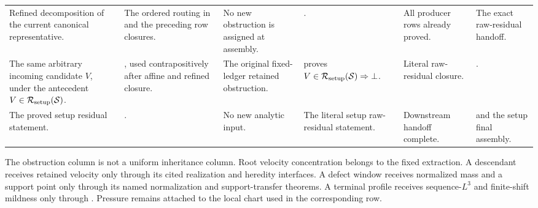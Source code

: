 \documentclass[11pt]{amsart}
\numberwithin{equation}{section}
\theoremstyle{plain}
\theoremstyle{definition}
\theoremstyle{remark}
\newcommand{\calS}{\mathcal S}
\newcommand{\calR}{\mathcal R}
\begin{document}
\begin{longtable}{@{}L{0.14\textwidth}L{0.19\textwidth}L{0.17\textwidth}L{0.17\textwidth}L{0.10\textwidth}L{0.14\textwidth}@{}}
Refined decomposition of the current canonical representative. &
The ordered routing in  and the preceding row
closures. &
No new obstruction is assigned at assembly. &
. &
All producer rows already proved. &
The exact raw-residual handoff.\\

The same arbitrary incoming candidate \(V\), under the antecedent
\(V\in\calR_{\rm setup}(\calS)\). &
, used contrapositively after affine
and refined closure. &
The original fixed-ledger retained obstruction. &
 proves
\(V\in\calR_{\rm setup}(\calS)\Rightarrow\bot\). &
Literal raw-residual closure. &
.\\

The proved setup residual statement. &
. &
No new analytic input. &
The literal setup raw-residual statement. &
Downstream handoff complete. &
 and the setup final assembly.\\
\hline
\end{longtable}
\endgroup

The obstruction column is not a uniform inheritance column.  Root velocity
concentration belongs to the fixed extraction.  A descendant receives retained
velocity only through its cited realization and heredity interfaces.  A defect
window receives normalized mass and a support point only through its named
normalization and support-transfer theorems.  A terminal profile receives
sequence-\(L^3\) and finite-shift mildness only through
.  Pressure remains attached to the
local chart used in the corresponding row.
\end{document}

